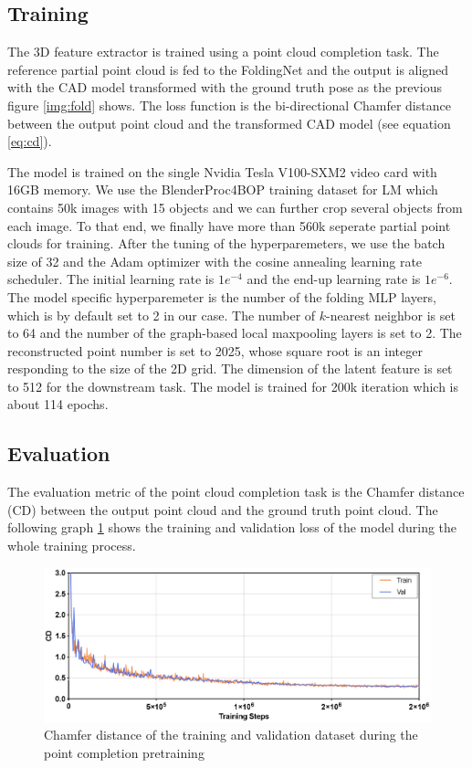 \documentclass[12pt,DIV14,BCOR12mm,a4paper,footinclude=false,headinclude,parskip=half-,twoside,openright,cleardoublepage=empty,toc=index,bibliography=totoc,listof=totoc]{scrreprt}
\numberwithin{equation}{chapter}
\begin{document}
\subsection{Training} 
The 3D feature extractor is trained using a point cloud completion task. The reference partial point cloud is fed to the FoldingNet and the output is aligned with the CAD model transformed with the ground truth pose as the previous figure \ref{img:fold} shows. The loss function is the bi-directional Chamfer distance between the output point cloud and the transformed CAD model (see equation \ref{eq:cd}).

The model is trained on the single Nvidia Tesla V100-SXM2 video card with 16GB memory. We use the BlenderProc4BOP training dataset for LM which contains 50k images with 15 objects and we can further crop several objects from each image. To that end, we finally have more than 560k seperate partial point clouds for training. After the tuning of the hyperparemeters, we use the batch size of 32 and the Adam optimizer with the cosine annealing learning rate scheduler. The initial learning rate is $1e^{-4}$ and the end-up learning rate is $1e^{-6}$. The model specific hyperparemeter is the number of the folding MLP layers, which is by default set to 2 in our case. The number of $k$-nearest neighbor is set to 64 and the number of the graph-based local maxpooling layers is set to 2. The reconstructed point number is set to 2025, whose square root is an integer responding to the size of the 2D grid. The dimension of the latent feature is set to 512 for the downstream task. The model is trained for 200k iteration which is about 114 epochs.
\subsection{Evaluation} 
The evaluation metric of the point cloud completion task is the Chamfer distance (CD) between the output point cloud and the ground truth point cloud. The following graph \ref{img:fold_loss} shows the training and validation loss of the model during the whole training process. 

\begin{figure}[h]
	\centering
	\includegraphics[width=1.\textwidth]{img/fold_loss.eps}
	\caption{Chamfer distance of the training and validation dataset during the point completion pretraining}
	\label{img:fold_loss}
\end{figure}
\end{document}
